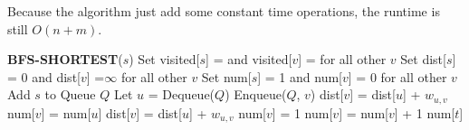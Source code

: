 \documentclass[a4paper,12pt]{article}
\begin{document}
Because the algorithm just add some constant time operations, the
runtime is still $O(n+m)$.

\begin{algorithm}
\begin{algorithmic}[1]
\STATE \textbf{BFS-SHORTEST}($s$)
\STATE Set visited[$s$] = \TRUE \;and visited[$v$] = \FALSE \;for all
other $v$
\STATE Set dist[$s$] = 0 and dist[$v$] =$\infty$ for all other $v$
\STATE Set num[$s$] = 1 and num[$v$] = 0 for all other $v$
\STATE Add $s$ to Queue $Q$
\STATE Let $u$ = Dequeue($Q$)
\STATE Enqueue($Q$, $v$)
\STATE dist[$v$] = dist[$u$] + $w_{u,v}$
\STATE num[$v$] = num[$u$]
\ELSE
{}
\STATE dist[$v$] = dist[$u$] + $w_{u,v}$
\STATE num[$v$] = 1
\STATE num[$v$] = num[$v$] + 1
\ENDIF
\ENDIF
\ENDFOR
\ENDWHILE
\RETURN num[$t$]
\end{algorithmic}
\end{algorithm}
\end{document}
